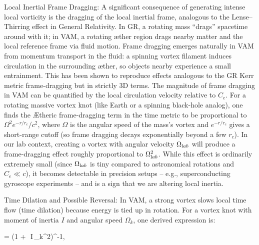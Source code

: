 Local Inertial Frame Dragging: A significant consequence of generating intense local vorticity is the dragging of the local inertial frame, analogous to the Lense–Thirring effect in General Relativity. In GR, a rotating mass “drags” spacetime around with it; in VAM, a rotating æther region drags nearby matter and the local reference frame via fluid motion. Frame dragging emerges naturally in VAM from momentum transport in the fluid: a spinning vortex filament induces circulation in the surrounding æther, so objects nearby experience a small entrainment. This has been shown to reproduce effects analogous to the GR Kerr metric frame-dragging but in strictly 3D terms. The magnitude of frame dragging in VAM can be quantified by the local circulation velocity relative to $C_e$. For a rotating massive vortex knot (like Earth or a spinning black-hole analog), one finds the Ætheric frame-dragging term in the time metric to be proportional to $\Omega^2 e^{-r/r_c}/c^2$, where $\Omega$ is the angular speed of the mass’s vortex and $e^{-r/r_c}$ gives a short-range cutoff (so frame dragging decays exponentially beyond a few $r_c$). In our lab context, creating a vortex with angular velocity $\Omega_{\textrm lab}$ will produce a frame-dragging effect roughly proportional to $\Omega_{\textrm lab}^2$. While this effect is ordinarily extremely small (since $\Omega_{\textrm lab}$ is tiny compared to astronomical rotations and $C_e \ll c$), it becomes detectable in precision setups – e.g., superconducting gyroscope experiments – and is a sign that we are altering local inertia.


Time Dilation and Possible Reversal: In VAM, a strong vortex slows local time flow (time dilation) because energy is tied up in rotation. For a vortex knot with moment of inertia $I$ and angular speed $\Omega_k$, one derived expression is:


 \;=\; \Big(1 + \,\beta\,I\,\Omega_k^2\Big)^{-1}, \label{eq:timedil}


